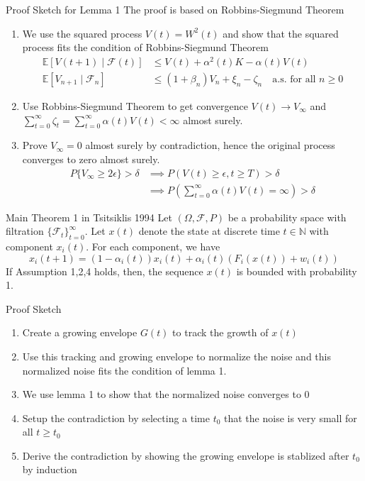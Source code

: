 \documentclass[aspectratio=169]{beamer} %
\begin{document}
\begin{frame}{Proof Sketch for Lemma 1}
    The proof is based on Robbins-Siegmund Theorem
\begin{enumerate}
    \item We use the squared process $V(t) =W^2(t)$ and show that the squared process fits the condition of Robbins-Siegmund Theorem
\begin{align*}
\mathbb{E}[V(t+1) \mid \mathcal{F}(t)] &\leq V(t) + \alpha^2(t) K -\alpha(t) V(t)\\
\mathbb{E}[V_{n+1} \mid \mathcal{F}_n] &\leq (1+\beta_n)V_n+\xi_n-\zeta_n\quad \text{a.s. for all } n \geq 0
\end{align*}
    \item Use Robbins-Siegmund Theorem to get convergence $V(t) \to V_\infty$ and $\sum_{t=0}^\infty \zeta_t = \sum_{t=0}^\infty \alpha (t)V(t)<\infty$ almost surely.
    \item Prove $V_\infty=0$ almost surely by contradiction, hence the original process converges to zero almost surely.
    \begin{align*}
         P\{V_\infty\ge2\epsilon\}>\delta &\implies P(V(t)\ge \epsilon, t\ge T)>\delta\\
         &\implies P\left(\sum_{t=0}^\infty \alpha (t)V(t)=\infty\right)>\delta
    \end{align*}
\end{enumerate}
\end{frame}

\begin{frame}{Main Theorem 1 in Tsitsiklis 1994}
Let $(\Omega, \mathcal{F},P)$ be a probability space with filtration $\{\mathcal{F}_t\}_{t=0}^\infty$. Let $x(t)$ denote the state at discrete time $t\in\mathbb{N}$ with component $x_i(t)$. For each component, we have
$$
x_i(t+1) = (1-\alpha_i(t))x_i(t) + \alpha_i(t)(F_i(x(t)) + w_i(t)) 
$$
If Assumption 1,2,4 holds, then, the sequence $x(t)$ is bounded with probability 1.

\end{frame}
\begin{frame}{Proof Sketch}
\begin{enumerate}
    \item Create a growing envelope $G(t)$ to track the growth of $x(t)$
    \item Use this tracking and growing envelope to normalize the noise and this normalized noise fits the condition of lemma 1.
    \item We use lemma 1 to show that the normalized noise converges to 0
    \item Setup the contradiction by selecting a time $t_0$ that the noise is very small for all $t\ge t_0$
    \item Derive the contradiction by showing the growing envelope is stablized after $t_0$ by induction
\end{enumerate}
    
\end{frame}
\end{document}
